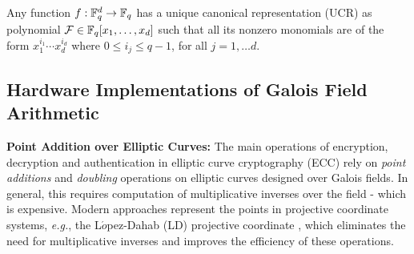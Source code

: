 \begin{Definition}
Any function $f: {\mathbb{F}}_{q}^d \to {\mathbb{F}}_{q}$ has a unique canonical representation
(UCR) as polynomial ${\mathcal{F}} \in {\mathbb{F}}_{q}[x_1,\dots, x_d]$ such that all its 
nonzero monomials are of the form $x_1^{i_1}\cdots x_d^{i_d}$ where $0
\leq i_j \leq q-1$, for all $j=1, \ldots d$.
\end{Definition}


\subsection{Hardware Implementations of Galois Field Arithmetic}

{\bf Point Addition over Elliptic Curves:} The main operations of
encryption, decryption and authentication in elliptic curve
cryptography (ECC) rely on {\it point additions} and {\it doubling}
operations on elliptic curves designed over Galois fields. 
In general, this requires computation of multiplicative inverses over
the field - which is expensive. Modern approaches represent
the points in projective coordinate systems, {\it e.g.}, the
L$\acute{o}$pez-Dahab (LD) projective coordinate \cite{eccld},
which eliminates the need for multiplicative inverses and improves the
efficiency of these operations. 




